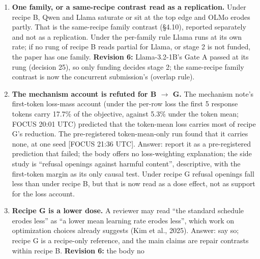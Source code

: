 \documentclass{article}
\theoremstyle{plain}
\theoremstyle{definition}
\theoremstyle{remark}
\begin{document}
\begin{enumerate}
        (development evidence). If B+Qi brings Qi et al.'s warmup to recipe B,
        it differs from recipe B in its schedule as well as its objective
        (decision 22). B+Qi stays as a reference because Qi et al.'s objective
        constrains updates on the initial tokens, a mechanism different from
        loss weighting; the paper must not justify it by the refuted
        loss-weighting account. A B+Qi equal to recipe B or to recipe G is still
        a valid reference result; no novelty is claimed for it.
  \item \textbf{One family, or a same-recipe contrast read as a replication.}
        Under recipe B, Qwen and Llama saturate or sit at the top edge and OLMo
        erodes partly. That is the same-recipe family contrast (\S{}4.10),
        reported separately and not as a replication. Under the per-family rule
        Llama runs at its own rate; if no rung of recipe B reads partial for
        Llama, or stage 2 is not funded, the paper has one family.
        \textbf{Revision 6:} Llama-3.2-1B's Gate A passed at its rung (decision
        25), so only funding decides stage 2; the same-recipe family contrast is
        now the concurrent submission's (overlap rule).
  \item \textbf{The mechanism account is refuted for B $\to$ G.} The mechanism
        note's first-token loss-mass account (under the per-row loss the first 5
        response tokens carry 17.7\% of the objective, against 5.3\% under the
        token mean; FOCUS 20:01 UTC) predicted that the token-mean loss carries
        most of recipe G's reduction. The pre-registered token-mean-only run
        found that it carries none, at one seed [FOCUS 21:36 UTC]. Answer:
        report it as a pre-registered prediction that failed; the body offers no
        loss-weighting explanation; the side study is ``refusal openings against
        harmful content'', descriptive, with the first-token margin as its only
        causal test. Under recipe G refusal openings fall less than under recipe
        B, but that is now read as a dose effect, not as support for the loss
        account.
  \item \textbf{Recipe G is a lower dose.} A reviewer may read ``the standard
        schedule erodes less'' as ``a lower mean learning rate erodes less'',
        which work on optimization choices already suggests (Kim et al., 2025).
        Answer: say so; recipe G is a recipe-only reference, and the main claims
        are repair contrasts within recipe B. \textbf{Revision 6:} the body no

\end{enumerate}
\end{document}
